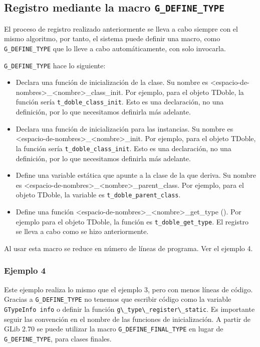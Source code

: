 \subsection{Registro mediante la macro \texttt{G\_DEFINE\_TYPE}}
El proceso de registro realizado anteriormente se lleva a cabo siempre con el mismo algoritmo, por tanto,
el sistema puede definir una macro, como \texttt{G\_DEFINE\_TYPE}  que lo lleve a cabo automáticamente,
con solo invocarla.

\texttt{G\_DEFINE\_TYPE} hace lo siguiente:
\begin{itemize}
  \tightlist
\item Declara una función de inicialización de la clase. Su nombre es \textsf{<espacio-de-nombres>\_<nombre>\_class\_init}. Por ejemplo, para el objeto \textsf{TDoble}, la función
  sería \texttt{t\_doble\_class\_init}. Esto es una declaración, no una definición, por lo que necesitamos
  definirla más adelante.
\item Declara una función de inicialización para las instancias. Su nombre es
\textsf{<espacio-de-nombres>\_<nombre>\_init}. Por ejemplo, para el objeto \textsf{TDoble}, la función
sería \texttt{t\_doble\_class\_init}. Esto es una declaración, no una definición, por lo que necesitamos
definirla más adelante.
\item Define una variable estática que apunte a la clase de la que deriva. Su nombre es
  \textsf{<espacio-de-nombres>\_<nombre>\_parent\_class}. Por ejemplo, para el objeto \textsf{TDoble},
  la variable es \texttt{t\_doble\_parent\_class}.
\item Define una función \textsf{<espacio-de-nombres>\_<nombre>\_get\_type ()}. Por ejemplo para
  el objeto \textsf{TDoble}, la función es \texttt{t\_doble\_get\_type}. El registro se lleva a cabo como
  se hizo anteriormente.
\end{itemize}

Al usar esta macro se reduce en número de líneas de programa. Ver el ejemplo 4.

\subsubsection{Ejemplo 4}
Este ejemplo realiza lo mismo que el ejemplo 3, pero con menos líneas de código.
Gracias a \texttt{G\_DEFINE\_TYPE} no tenemos que escribir código como la variable \texttt{GTypeInfo info}
o definir la función  \passthrough{\lstinline!g\_type\_register\_static!}.
Es importante seguir las convención en el nombre de las funciones de inicialización.
A partir de \textsf{GLib 2.70} se puede utilizar la macro \texttt{G\_DEFINE\_FINAL\_TYPE} en lugar de
\texttt{G\_DEFINE\_TYPE}, para clases finales.

